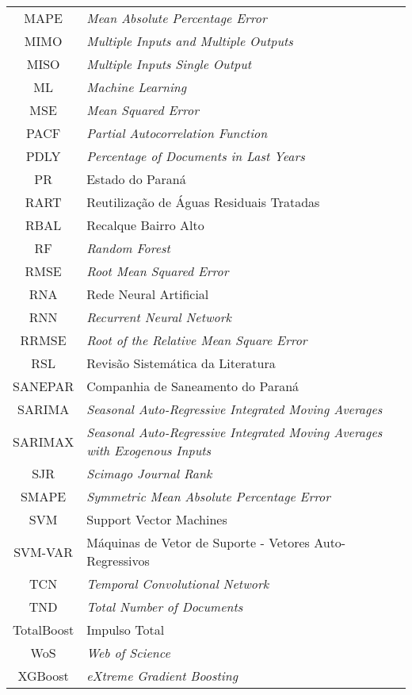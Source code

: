\begin{tabular}{cp{}}
	MAPE & \textit{Mean Absolute Percentage Error}\\
	MIMO & \textit{Multiple Inputs and Multiple Outputs}\\
	MISO & \textit{Multiple Inputs Single Output}\\
	ML & \textit{Machine Learning}	\\
	MSE & \textit{Mean Squared Error}\\
	PACF & \textit{Partial Autocorrelation Function}\\
	PDLY & \textit{Percentage of Documents in Last Years}\\
	PR & Estado do Paraná\\
	RART & Reutilização de Águas Residuais Tratadas\\
	RBAL & Recalque Bairro Alto\\
	RF & \textit{Random Forest}\\
	RMSE & \textit{Root Mean Squared Error}\\
	RNA & Rede Neural Artificial\\
	RNN & \textit{Recurrent Neural Network}\\
	RRMSE & \textit{Root of the Relative Mean Square Error}\\
	RSL & Revisão Sistemática da Literatura \\
	SANEPAR & Companhia de Saneamento do Paraná \\
	SARIMA & \textit{Seasonal Auto-Regressive Integrated Moving Averages} \\
	SARIMAX & \textit{Seasonal Auto-Regressive Integrated Moving Averages with Exogenous Inputs} \\
	SJR & \textit{Scimago Journal Rank}\\
	SMAPE &  \textit{Symmetric Mean Absolute Percentage Error}\\
	SVM & Support Vector Machines \\
	SVM-VAR & Máquinas de Vetor de Suporte - Vetores Auto-Regressivos\\
	TCN & \textit{Temporal Convolutional Network} \\
	TND & \textit{Total Number of Documents}\\
	TotalBoost & Impulso Total\\
	WoS & \textit{Web of Science} \\
	XGBoost & \textit{eXtreme Gradient Boosting}
\end{tabular}
